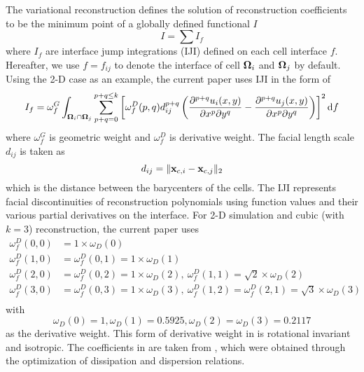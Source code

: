 The variational reconstruction defines the solution of reconstruction coefficients
to be the minimum point of a globally defined functional $I$
\begin{equation}
    I = \sum{I_f}
\end{equation}
where $I_f$ are interface jump integrations (IJI) defined on each cell interface $f$.
Hereafter, we use $f=f_{ij}$ to denote the interface of cell $\mathbf{\Omega}_{i}$ and $\mathbf{\Omega}_{j}$ by default.
Using the 2-D case as an example, the current paper uses IJI in the form of
\begin{equation}
    I_f = \omega_f^G\int_{\OO_i \cap \OO_j}{
        \sum_{p+q=0}^{p + q\leq k}\left[
            \omega_f^D(p,q)
            d_{ij}^{p+q}
            \left(
            \partialderivative{^{p+q}u_i(x,y)}{x^p\partial y^q}
            -
            \partialderivative{^{p+q}u_j(x,y)}{x^p\partial y^q}
            \right)
            \right]^2
        \dd f
    }
\end{equation}
where $\omega_f^G$ is geometric weight and
$\omega_f^D$ is derivative weight.
The facial length scale  $d_{ij}$
is taken as
\begin{equation}
    d_{ij} = \|\mathbf{x}_{c,i}-\mathbf{x}_{c,j}\|_2
\end{equation}
which is the distance between the barycenters of the cells.
The IJI represents facial discontinuities of reconstruction polynomials using
function values and their various partial derivatives on the interface.
For 2-D simulation and cubic (with $k=3$)
reconstruction, the current paper uses
\begin{equation}
    \begin{aligned}
        \omega_f^D(0,0) & = 1\times \omega_D(0)                                                                                    \\
        \omega_f^D(1,0) & = \omega_f^D(0,1) = 1\times \omega_D(1)                                                                  \\
        \omega_f^D(2,0) & = \omega_f^D(0,2) = 1\times \omega_D(2),\ \omega_f^D(1,1) = \sqrt{2}\times \omega_D(2)                   \\
        \omega_f^D(3,0) & = \omega_f^D(0,3) = 1\times \omega_D(3),\ \omega_f^D(1,2) = \omega_f^D(2,1) = \sqrt{3}\times \omega_D(3) \\
    \end{aligned}
    \label{eq:wdRotRatio}
\end{equation}
with
\begin{equation}
    \omega_D(0) = 1, \omega_D(1) = 0.5925, \omega_D(2) = \omega_D(3) = 0.2117
    \label{eq:wdHQMOPT}
\end{equation}
as the derivative weight.
This form of derivative weight in  is rotational invariant and
isotropic.
The coefficients in  are taken from \cite{huang2022high}, which were
obtained through the
optimization of dissipation and dispersion relations.

